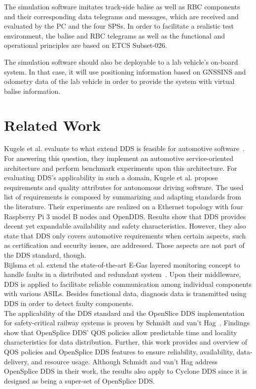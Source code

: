 \documentclass[a4paper, 12pt]{scrartcl}
\begin{document}
The simulation software imitates track-side balise as well as \gls*{RBC} components and their corresponding data telegrams and messages, which are received and evaluated by the PC and the four \glspl*{SPS}.
In order to facilitate a realistic test environment, the balise and \gls*{RBC} telegrams as well as the functional and operational principles are based on \gls*{ETCS} Subset-026.

The simulation software should also be deployable to a lab vehicle's on-board system.
In that case, it will use positioning information based on \gls*{GNSSINS} and odometry data of the lab vehicle in order to provide the system with virtual balise information.


\section*{Related Work}
Kugele et al. evaluate to what extend \gls*{DDS} is feasible for automotive software~\cite{KugeleDataCentricForAuto}.
For answering this question, they implement an automotive service-oriented architecture and perform benchmark experiments upon this architecture.
For evaluating \gls*{DDS}'s applicability in such a domain, Kugele et al. propose requirements and quality attributes for autonomous driving software.
The used list of requirements is composed by summarizing and adapting standards from the literature.
Their experiments are realized on a Ethernet topology with four Raspberry Pi 3 model B nodes and OpenDDS.
Results show that \gls*{DDS} provides decent yet expandable availability and safety characteristics.
However, they also state that \gls*{DDS} only covers automotive requirements when certain aspects, such as certification and security issues, are addressed.
Those aspects are not part of the \gls*{DDS} standard, though.
\\

Bijlsma et al. extend the state-of-the-art E-Gas layered monitoring concept to handle faults in a distributed and redundant system~\cite{DistributedSafety2020}.
Upon their middleware, \gls*{DDS} is applied to facilitate reliable communication among individual components with various \glspl*{ASIL}.
Besides functional data, diagnosis data is transmitted using \gls*{DDS} in order to detect faulty components.
\\

The applicability of the \gls*{DDS} standard and the OpenSlice DDS implementation for safety-critical railway systems is proven by Schmidt and van't Hag~\cite{SchmidtMissionCriticalChallenges}.
Findings show that OpenSplice DDS' \gls*{QOS} policies allow predictable time and locality characteristics for data distribution.
Further, this work provides and overview of \gls*{QOS} policies and OpenSplice DDS features to ensure reliability, availability, data-delivery, and resource usage.
Although Schmidt and van't Hag address OpenSplice DDS in their work, the results also apply to Cyclone DDS since it is designed as being a super-set of OpenSplice DDS.
\\
\end{document}
